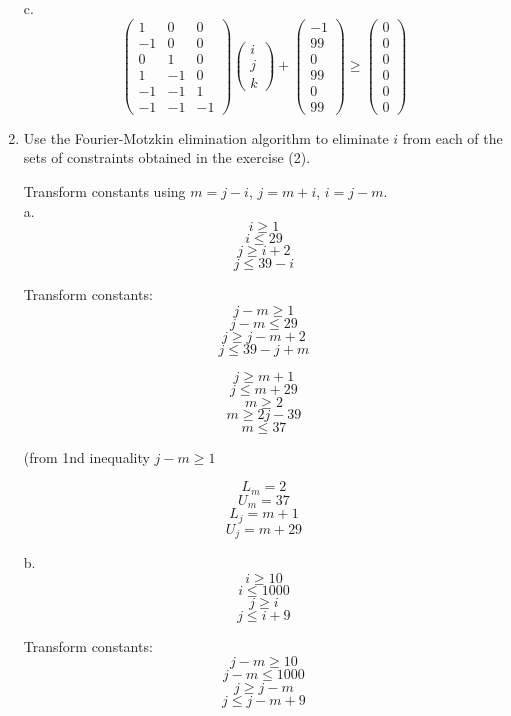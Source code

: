 \documentclass[11pt]{article}
\begin{document}
\begin{enumerate}
\begin{Answer}
		c.
		$$
		\begin{pmatrix}
		1 & 0 & 0  \\
		-1 & 0 & 0  \\
		0 & 1 & 0 \\
		1 & -1 & 0 \\
		-1 & -1 & 1 \\
		-1 & -1 & -1 
		\end{pmatrix}
		\begin{pmatrix}
		i \\
		j \\
		k
		\end{pmatrix}
		+
		\begin{pmatrix}
		-1 \\
		99 \\
		0 \\
		99 \\
		0 \\
		99
		\end{pmatrix}
		\ge
		\begin{pmatrix}
		0 \\
		0 \\
		0 \\
		0 \\
		0 \\
		0 
		\end{pmatrix}
		$$
		\end{Answer}
		\newpage
	\item Use the Fourier-Motzkin elimination algorithm to eliminate $i$ from each of the sets of constraints obtained in the exercise (2).
		\begin{Answer}
		Transform constants using $m=j -i$, $j = m + i$, $i = j - m$. \\
		a. 
		$$i \ge 1$$
		$$i \le 29$$
		$$j \ge i + 2$$
		$$j \le 39 - i$$
		
		Transform constants:
		$$j - m \ge 1$$
		$$j - m \le 29$$
		$$j \ge j - m + 2$$
		$$j \le 39 - j + m$$
		
		$$j \ge m + 1$$
		$$j \le m + 29$$
		$$m \ge 2$$
		$$m \ge 2j - 39$$
		$$m \le 37$$ 
		
		(from 1nd inequality $j - m \ge 1$

		$$L_m = 2$$
		$$U_m = 37$$
		$$L_j = m + 1$$
		$$U_j = m + 29$$

		b.
		$$i \ge 10$$
		$$i \le 1000$$
		$$j \ge i$$
		$$j \le i + 9$$
		
		Transform constants:
		$$j - m \ge 10$$
		$$j - m \le 1000$$
		$$j \ge j - m$$
		$$j \le j - m + 9$$
		

\end{Answer}
\end{enumerate}
\end{document}
